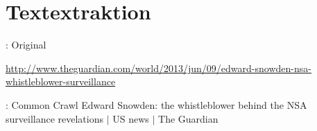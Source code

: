\documentclass[12pt, utf8, ngerman]{beamer}
\begin{document}
\section{Textextraktion}

\begin{frame}{\insertsection: Original}

    \scriptsize
    \vspace{.1cm}
    \url{http://www.theguardian.com/world/2013/jun/09/edward-snowden-nsa-whistleblower-surveillance}
\end{frame}

\begin{frame}{\insertsection: Common Crawl}
    \scriptsize
    Edward Snowden: the whistleblower behind the NSA surveillance revelations $|$ US news $|$ The Guardian
\end{frame}
\end{document}
